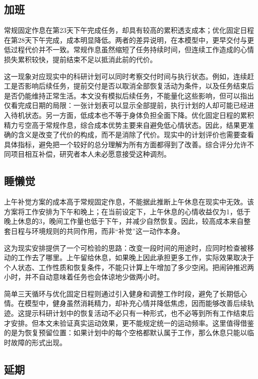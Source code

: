 \documentclass[journal]{IEEEtran}
\begin{document}
\subsection{加班}

常规固定作息在第23天下午完成任务，却具有较高的累积透支成本；优化固定日程在第28天下午完成，成本明显降低。两者的差异说明，在本模型中，更早交付与更低过程代价并不一致。常规作息虽然缩短了任务持续时间，但连续工作造成的心情损失累积较快，提前结束不足以抵消此前的代价。

这一现象对应现实中的科研计划可以同时考察交付时间与执行状态。例如，连续赶工是否影响后续任务，提前交付是否以取消全部恢复活动为条件，以及任务结束后是否仍能维持正常生活。本文没有模拟后续任务，不能量化这些影响，但可以指出仅看完成日期的局限：一张计划表可以显示全部提前，执行计划的人却可能已经进入待机状态。另一方面，低成本也不等于身体负担全面下降。优化固定日程的累积精力亏空高于常规作息，综合成本优势主要来自避免低心情状态。因此，结果更准确的含义是改变了代价的构成，而不是消除了代价。现实中的计划评价也需要查看具体指标，避免把一个较好的总分理解为所有方面都得到了改善。综合评分允许不同项目相互补偿，研究者本人未必愿意接受这种调剂。

\subsection{睡懒觉}

上午补觉方案的成本高于常规固定作息，不能据此推断上午休息在现实中无效。该方案将工作安排为下午和晚上；在当前设定下，上午休息的心情收益仅为1，低于晚上休息的3，晚间工作量也低于下午，并减少自然恢复。因此，较高成本来自整套日程与环境规则的共同作用，而非“补觉”这一动作本身。

这为现实安排提供了一个可检验的思路：改变一段时间的用途时，应同时检查被移动的工作去了哪里。上午留给休息，如果晚上因此承担更多工作，实际效果取决于个人状态、工作性质和恢复条件，不能只计算上午增加了多少空闲。把闹钟推迟两小时，并不自动意味着任务也会体谅地少做两小时。

简单三天循环与优化固定日程则通过引入健身和调整工作时段，避免了长期低心情。在模型中，健身虽然消耗精力，却补充心情并降低焦虑，因而能够改善后续轨迹。这提示科研计划中的恢复活动不必只有一种形式，也不必等到所有工作结束后才安排。但本文未验证真实运动效果，更不能规定统一的运动频率。这里值得借鉴的是为恢复预留位置：如果计划中的每个空格都默认属于工作，那么休息只能以临时故障的形式出现。

\subsection{延期}
\end{document}
